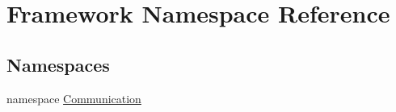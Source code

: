 \hypertarget{namespaceFramework}{
\section{Framework Namespace Reference}
\label{namespaceFramework}
}
\subsection*{Namespaces}
\begin{DoxyCompactItemize}
\item 
namespace \hyperlink{namespaceFramework_1_1Communication}{Communication}
\end{DoxyCompactItemize}
